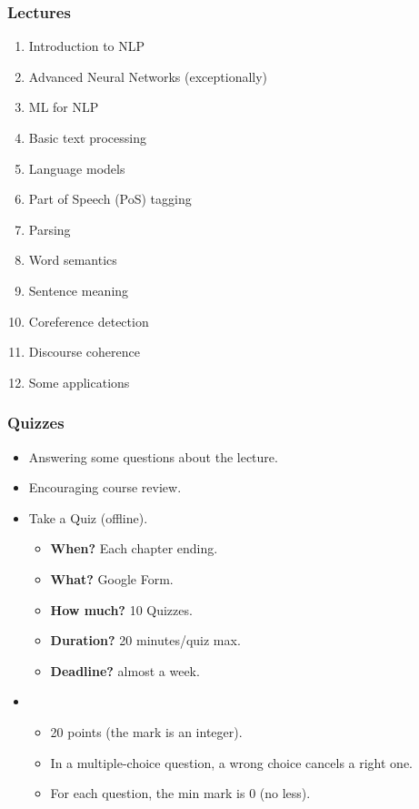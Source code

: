 \documentclass{beamer}
\begin{document}
\begin{frame}
\frametitle{Lectures}

\begin{enumerate}
	\item Introduction to NLP
	\item {\color{red}Advanced Neural Networks (exceptionally)}
	\item ML for NLP
	\item Basic text processing
	\item Language models
	\item Part of Speech (PoS) tagging
	\item Parsing
	\item Word semantics
	\item Sentence meaning
	\item Coreference detection
	\item Discourse coherence
	\item Some applications
\end{enumerate}

\end{frame}

\begin{frame}
	\frametitle{Quizzes}
	
	\begin{itemize}
		\item Answering some questions about the lecture.
		\item {} Encouraging course review.
		\item {} Take a Quiz (offline).
		\begin{itemize}
			\item \textbf{When?} Each chapter ending.
			\item \textbf{What?} Google Form.
			\item \textbf{How much?} 10 Quizzes.
			\item \textbf{Duration?} 20 minutes/quiz max.
			\item \textbf{Deadline?} almost a week.
		\end{itemize}
		\item {}
		\begin{itemize}
			\item 20 points (the mark is an integer).
			\item In a multiple-choice question, a wrong choice cancels a right one.
			\item For each question, the min mark is 0 (no less).
		\end{itemize}
	\end{itemize}
	
\end{frame}
\end{document}

